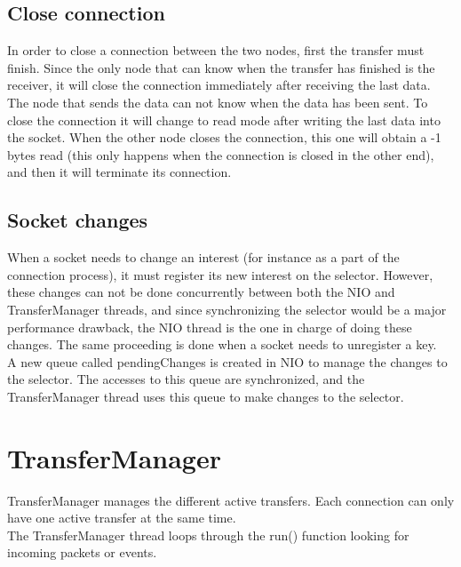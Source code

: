 \documentclass[11pt]{article}
\begin{document}
\subsection{Close connection}
	In order to close a connection between the two nodes, first the transfer must finish. Since the only node that can know when the transfer has finished is the receiver, it will close the connection immediately after receiving the last data.\\
	The node that sends the data can not know when the data has been sent. To close the connection it will change to read mode after writing the last data into the socket. When the other node closes the connection, this one will obtain a -1 bytes read (this only happens when the connection is closed in the other end), and then it will terminate its connection.
	
\subsection{Socket changes}
	When a socket needs to change an interest (for instance as a part of the connection process), it must register its new interest on the selector. However, these changes can not be done concurrently between both the NIO and TransferManager threads, and since synchronizing the selector would be a major performance drawback, the NIO thread is the one in charge of doing these changes. The same proceeding is done when a socket needs to unregister a key.\\
	A new queue called pendingChanges is created in NIO to manage the changes to the selector. The accesses to this queue are synchronized, and the TransferManager thread uses this queue to make changes to the selector.

\section{TransferManager}
	TransferManager manages the different active transfers. Each connection can only have one active transfer at the same time.\\
	The TransferManager thread loops through the run() function looking for incoming packets or events. 
\end{document}
